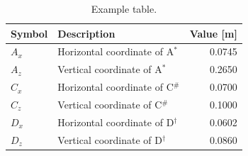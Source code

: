 \documentclass[a4paper, 10pt, journal]{wissarbIEEE}      %
\begin{document}
\begin{table}[h]
\caption{Example table.}
   \begin{tabularx}{0.48\textwidth}{llr}
   		 \toprule 
   		 Symbol & \multicolumn{1}{X}{Description} & Value [m] \\
		 \midrule
		  $A_x$ & Horizontal coordinate of A$^{*}$ & 0.0745 \\
		  $A_z$ & Vertical coordinate of A$^{*}$ & 0.2650 \\  \noalign{\smallskip}
		  
		  $C_x$ & Horizontal coordinate of C$^{\#}$ & 0.0700 \\
		  $C_z$ & Vertical coordinate of C$^{\#}$ & 0.1000 \\
		  $D_x$ & Horizontal coordinate of D$^{\dag}$ & 0.0602 \\
		  $D_z$ & Vertical coordinate of D$^{\dag}$ & 0.0860 \\
		 \bottomrule
   \end{tabularx}  \label{tab:initmodel}
\end{table}

\lipsum[2]


\end{document}
